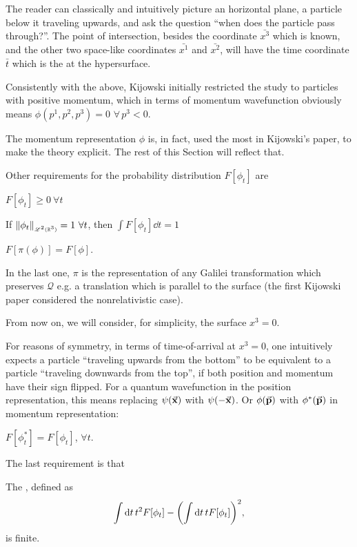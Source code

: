 The reader can classically and intuitively picture an horizontal plane,
a particle below it traveling upwards, and ask the question
``when does the particle pass through?''. The point of intersection,
besides the coordinate $\bar{x^3}$ which is known, and the other two space-like coordinates $\bar{x^1}$ and $\bar{x^2}$,
will have the time coordinate $\bar{t}$ which is the  at the hypersurface.

Consistently with the above, Kijowski initially restricted the study to
particles with positive momentum, which in terms of momentum wavefunction
obviously means ${\phi(p^1, p^2, p^3) = 0} \,\, {\forall \, p^3 < 0}$.

The momentum representation $\phi$ is, in fact, used the most in Kijowski's
paper, to make the theory explicit. The rest of this Section will reflect that.

Other requirements for the probability distribution $F[\phi_t]$ are
\begin{axiom}
  $F[\phi_t] \ge 0 \ \forall t$
\end{axiom}
\begin{axiom}
  If $\norm{\phi_t}_{\scriptscriptstyle{\mathscr{L}^2(\mathbb{R}^3)}} = 1 \ \forall t$, then $\int F[\phi_t] \dd t = 1$
\end{axiom}
\begin{axiom}
  $F[\pi(\phi)] = F[\phi]$.
\end{axiom}
In the last one, $\pi$
is the representation of any Galilei transformation
which preserves $\mathcal{Q}$
e.g. a translation which is parallel to the surface
(the first Kijowski paper considered the nonrelativistic case).

From now on, we will consider, for simplicity, the surface $x^3 = 0$.

For reasons of symmetry, in terms of time-of-arrival at $x^3 = 0$,
one intuitively expects a particle
``traveling upwards from the bottom'' to be equivalent
to a particle
``traveling downwards from the top'',
if both position and momentum have their sign flipped.
For a quantum wavefunction in the position representation,
this means
replacing $\psi(\va{x})$ with $\psi(-\va{x})$.
Or $\phi(\va{p})$ with $\phi^{*}(\va{p})$ in momentum representation:
\begin{axiom}
  $F[\phi^{*}_t] = F[\phi_t]$, $\forall t$.
\end{axiom}

The last requirement is that
\begin{axiom}\label{ax:kijowski:last}
    The , defined as
    \begin{equation}\label{eq:kijowski:dispersion}
      \int \dd{t} t^2 F[\phi_t] - \qty(\int \dd{t} t F[\phi_t] )^2 \text{,}
    \end{equation}
    is finite.
\end{axiom}

